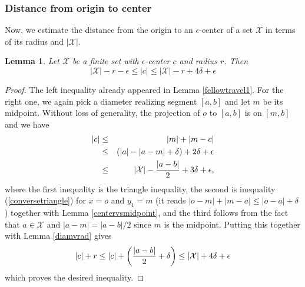 \documentclass[11pt,letterpaper]{amsart}
\newtheorem{lemma}[theorem]{Lemma}
\newtheorem*{remark}{Remark}
\begin{document}
\subsubsection*{Distance from origin to center}
Now, we estimate the distance from the origin to an $\epsilon$-center of a set $\mathcal X$ in terms of its radius and $|\mathcal X|$.
\begin{lemma}
\label{distancetocenter}
Let $\mathcal X$ be a finite set with $\epsilon$-center $c$ and radius $r$. Then
$$
|\mathcal X|-r-\epsilon\leq|c|\leq |\mathcal X|-r+4\delta+\epsilon
$$
\end{lemma}
\begin{proof}
The left inequality already appeared in Lemma \ref{fellowtravel1}. For the right one, we again pick a diameter realizing segment $[a,b]$ and let $m$ be its midpoint. 
Without loss of generality, the projection of $o$ to $[a,b]$ is on $[m,b]$ and we have 
\begin{eqnarray*}
|c|&\leq&|m|+|m-c|\\
&\leq&(|a|-|a-m|+\delta)+2\delta+\epsilon\\
&\leq& |\mathcal X|-{|a-b|\over 2}+3\delta+\epsilon,
\end{eqnarray*}
where the first inequality is the triangle inequality, the second is inequality (\ref{conversetriangle}) for $x=o$ and $y_1=m$ (it reads $|o-m|+|m-a|\leq|o-a|+\delta$) together with Lemma \ref{centervsmidpoint}, and the third follows from the fact that $a\in\mathcal X$ and $|a-m|=|a-b|/2$ since $m$ is the midpoint.
Putting this together with Lemma \ref{diamvrad} gives
$$
|c|+r\leq|c|+\left({|a-b|\over 2}+\delta\right)\leq |\mathcal X|+4\delta+\epsilon
$$
which proves the desired inequality. 
\end{proof}
\end{document}
